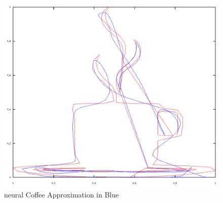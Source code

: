 \documentclass{article}
\begin{document}
\begin{figure}[tb]
	\begin{center}
		\includegraphics[scale=0.4]{img/coffee4}
	\end{center}
	\caption{neural Coffee Approximation in Blue}
	\label{fig:coffee4}
\end{figure}


\vspace{3in}
\end{document}
